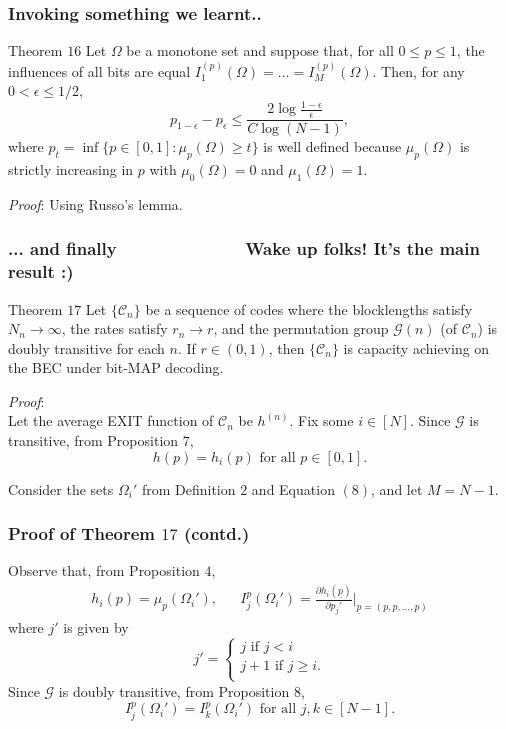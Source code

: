 \documentclass[xcolor=dvipsnames]{beamer}
\begin{document}
\begin{frame}
\frametitle{Invoking something we learnt..}
\begin{block}{Theorem $16$}
Let $\Omega$ be a monotone set and suppose that, for all $0 \le p \le 1$, the influences of all bits are equal $I_1^{(p)}(\Omega) = \ldots = I_M^{(p)}(\Omega)$. Then, for any $0 < \epsilon \le 1/2$, $$p_{1-\epsilon} - p_\epsilon \le \frac{2 \log \frac{1-\epsilon}{\epsilon}}{C\log (N-1)},$$ where $p_t = \inf\{p \in [0,1] : \mu_p (\Omega) \ge t\}$ is well defined because $\mu_p(\Omega)$ is strictly increasing in $p$ with $\mu_0(\Omega) = 0$ and $\mu_1(\Omega)=1$.
\end{block}
\emph{Proof}: Using Russo's lemma.
\end{frame}


\begin{frame}
\frametitle{... and finally ~~~~~~~~~~~~~\tiny{Wake up folks! It's the main result :)}}
\begin{block}{Theorem $17$}
Let $\{\mathcal{C}_n\}$ be a sequence of codes where the blocklengths satisfy $N_n \to \infty$, the rates satisfy $r_n \to r$, and the permutation group $\mathcal{G}(n)$ (of $\mathcal{C}_n$) is doubly transitive for each $n$. If $r \in (0,1)$, then $\{\mathcal{C}_n\}$ is capacity achieving on the BEC under bit-MAP decoding.
\end{block}
\normalsize
\emph{Proof}: \\Let the average EXIT function of $\mathcal{C}_n$ be $h^{(n)}$. Fix some $i \in [N]$. Since $\mathcal{G}$ is transitive, from Proposition $7$, $$h(p) = h_i(p) \text{ for all } p \in [0,1].$$

Consider the sets $\Omega_i'$ from Definition $2$ and Equation $(8)$, and let $M=N-1$. 
\end{frame}

\begin{frame}
\frametitle{Proof of Theorem $17$ (contd.)}
Observe that, from Proposition $4$,
\begin{align*}
h_i(p) = \mu_p(\Omega_i'), &&I_j^{p}(\Omega_i') = \frac{\partial h_i(\underline{p})}{\partial p_j'}\Bigg|_{\underline{p}=(p,p,\ldots,p)}
\end{align*}
where $j'$ is given by 
\[
    j'=\left\{
                \begin{array}{ll}
                  j \text{ if } j < i\\
                  j+1 \text{ if } j \ge i.\\
                \end{array}
              \right.
  \]
Since $\mathcal{G}$ is doubly transitive, from Proposition $8$, $$I_j^{p}(\Omega_i') = I_k^{p}(\Omega_i') \text{ for all } j,k \in [N-1].$$
\end{frame}
\end{document}

